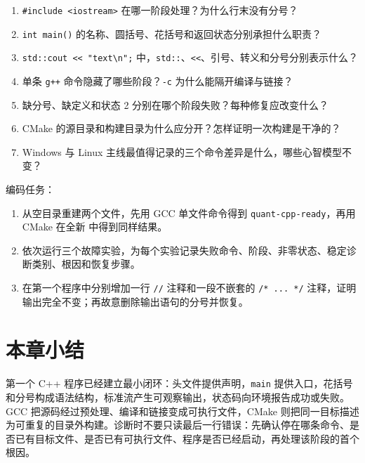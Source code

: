 \begin{enumerate}
  \item \texttt{\#include <iostream>} 在哪一阶段处理？为什么行末没有分号？
  \item \texttt{int main()} 的名称、圆括号、花括号和返回状态分别承担什么职责？
  \item \texttt{std::cout << "text\textbackslash n";} 中，\texttt{std::}、\texttt{<<}、引号、转义和分号分别表示什么？
  \item 单条 \texttt{g++} 命令隐藏了哪些阶段？\texttt{-c} 为什么能隔开编译与链接？
  \item 缺分号、缺定义和状态 2 分别在哪个阶段失败？每种修复应改变什么？
  \item CMake 的源目录和构建目录为什么应分开？怎样证明一次构建是干净的？
  \item Windows 与 Linux 主线最值得记录的三个命令差异是什么，哪些心智模型不变？
\end{enumerate}

编码任务：

\begin{enumerate}
  \item 从空目录重建两个文件，先用 GCC 单文件命令得到 \texttt{quant-cpp-ready}，再用 CMake 在全新  中得到同样结果。
  \item 依次运行三个故障实验，为每个实验记录失败命令、阶段、非零状态、稳定诊断类别、根因和恢复步骤。
  \item 在第一个程序中分别增加一行 \texttt{//} 注释和一段不嵌套的 \texttt{/* ... */} 注释，证明输出完全不变；再故意删除输出语句的分号并恢复。
\end{enumerate}


\section{本章小结}

第一个 C++ 程序已经建立最小闭环：头文件提供声明，\texttt{main} 提供入口，花括号和分号构成语法结构，标准流产生可观察输出，状态码向环境报告成功或失败。GCC 把源码经过预处理、编译和链接变成可执行文件，CMake 则把同一目标描述为可重复的目录外构建。诊断时不要只读最后一行错误：先确认停在哪条命令、是否已有目标文件、是否已有可执行文件、程序是否已经启动，再处理该阶段的首个根因。

